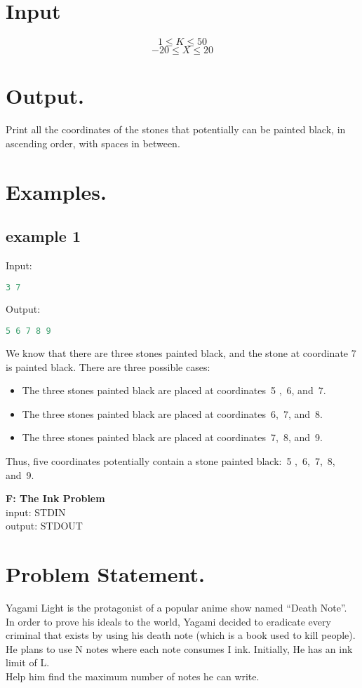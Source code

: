 \documentclass[10pt]{article}
\begin{document}
\section{Input}
$$ 1\le K \le 50 $$
$$ -20\le X \le 20 $$
\section{Output.}
Print all the coordinates of the stones that potentially can be painted black, in ascending order, with spaces in between.
\section{Examples.}
\subsection{example 1}
Input:
\begin{lstlisting}[language=Python]
3 7
\end{lstlisting}
Output:
\begin{lstlisting}[language=Python]
5 6 7 8 9
\end{lstlisting}
We know that there are three stones painted black, and the stone at coordinate 7 is painted black. There are three possible cases:
\begin{itemize}
\item The three stones painted black are placed at coordinates 5 , 6, and 7.
\item The three stones painted black are placed at coordinates 6, 7, and 8.
\item The three stones painted black are placed at coordinates 7, 8, and 9.
\end{itemize}
Thus, five coordinates potentially contain a stone painted black: 5 , 6, 7, 8, and 9.
\newpage
\begin{center}
    \Huge { \textbf{F: The Ink Problem}}\\
\normalsize  { input:  STDIN}\\
\normalsize{    output: STDOUT}
\end{center}
\section{Problem Statement.}
Yagami Light is the protagonist of a popular anime show named “Death Note”.\\
In order to prove his ideals to the world, Yagami decided to eradicate every criminal that exists by using
his death note (which is a book used to kill people).\\
He plans to use N notes where each note consumes I ink. Initially, He has an ink limit of L.\\
Help him find the maximum number of notes he can write.
\end{document}
